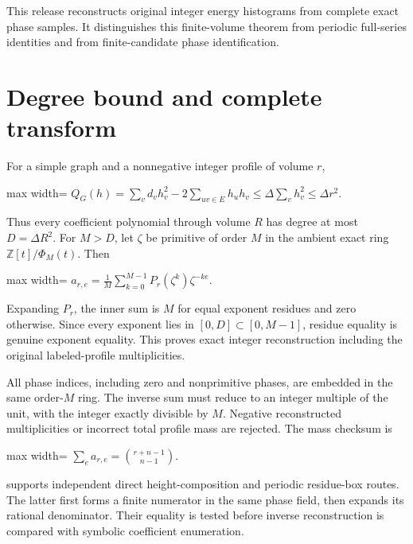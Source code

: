 \documentclass[
  11pt,
  a4paper,
]{report}
\let\singularitytexttt\texttt
\renewcommand{\texttt}[1]{\singularitytexttt{\seqsplit{#1}}}
\begin{document}
This release reconstructs original integer energy histograms from
complete exact phase samples. It distinguishes this finite-volume
theorem from periodic full-series identities and from finite-candidate
phase identification.

\hypertarget{degree-bound-and-complete-transform}{%
\section{Degree bound and complete
transform}\label{degree-bound-and-complete-transform}}

For a simple graph and a nonnegative integer profile of volume \(r\), \begin{center}
\begin{adjustbox}{max width=\linewidth}
$\displaystyle
 Q_G(h)=\sum_vd_vh_v^2-2\sum_{uv\in E}h_uh_v
 \le\Delta\sum_vh_v^2\le\Delta r^2.
$
\end{adjustbox}
\end{center} Thus every coefficient polynomial through volume \(R\) has degree at
most \(D=\Delta R^2\). For \(M>D\), let \(\zeta\) be primitive of order
\(M\) in the ambient exact ring \(\mathbb Z[t]/\Phi_M(t)\). Then \begin{center}
\begin{adjustbox}{max width=\linewidth}
$\displaystyle
 a_{r,e}=\frac1M\sum_{k=0}^{M-1}P_r(\zeta^k)\zeta^{-ke}.
$
\end{adjustbox}
\end{center} Expanding \(P_r\), the inner sum is \(M\) for equal exponent residues
and zero otherwise. Since every exponent lies in
\([0,D]\subset[0,M-1]\), residue equality is genuine exponent equality.
This proves exact integer reconstruction including the original
labeled-profile multiplicities.

All phase indices, including zero and nonprimitive phases, are embedded
in the same order-\(M\) ring. The inverse sum must reduce to an integer
multiple of the unit, with the integer exactly divisible by \(M\).
Negative reconstructed multiplicities or incorrect total profile mass
are rejected. The mass checksum is \begin{center}
\begin{adjustbox}{max width=\linewidth}
$\displaystyle
 \sum_e a_{r,e}=\binom{r+n-1}{n-1}.
$
\end{adjustbox}
\end{center}

\texttt{phase\_table} supports independent direct height-composition and
periodic residue-box routes. The latter first forms a finite numerator
in the same phase field, then expands its rational denominator. Their
equality is tested before inverse reconstruction is compared with
symbolic coefficient enumeration.
\end{document}
